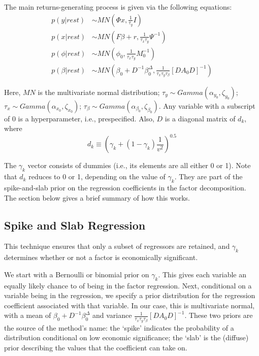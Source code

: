 \documentclass[11pt]{article}
\begin{document}
The main returns-generating process is given via the following equations:
\begin{align}
	p(y | rest) &\sim MN\left( \Phi x, \frac{1}{\tau_y} I \right)	\\
	p(x | rest) &\sim MN\left( F \beta + r, \frac{1}{\tau_x \tau_y} \Psi^{-1} \right)	\\
	\label{eq:phi} p(\phi | rest) &\sim MN\left( \phi_0, \frac{1}{\tau_x \tau_y} M_0^{-1} \right) 	\\
	p(\beta | rest) &\sim MN\left( \beta_0 + D^{-1}\beta_0^\Delta, \frac{1}{\tau_x \tau_y \tau_\beta} [D A_0 D]^{-1} \right)
\end{align}

Here, $MN$ is the multivariate normal distribution; $\tau_y \sim Gamma \left( \alpha_{y_0}, \zeta_{y_0} \right)$; $\tau_x \sim Gamma \left( \alpha_{x_0}, \zeta_{x_0} \right)$; $\tau_\beta \sim Gamma \left( \alpha_{\beta_0}, \zeta_{\beta_0} \right)$. Any variable with a subscript of 0 is a hyperparameter, i.e., prespecified. Also, $D$ is a diagonal matrix of $d_k$, where
\begin{equation}
	d_k \equiv \left( \gamma_k + (1 - \gamma_k) \frac{1}{v^2} \right)^{0.5}
\end{equation}

The $\gamma_k$ vector consists of dummies (i.e., its elements are all either 0 or 1). Note that $d_k$ reduces to 0 or 1, depending on the value of $\gamma_k$.  They are part of the spike-and-slab prior on the regression coefficients in the factor decomposition. The section below gives a brief summary of how this works.

\subsection{Spike and Slab Regression}

This technique ensures that only a subset of regressors are retained, and $\gamma_k$ determines whether or not a factor is economically significant. 

We start with a Bernoulli or binomial prior on $\gamma_k$. This gives each variable an equally likely chance to of being in the factor regression. Next, conditional on a variable being in the regression, we specify a prior distribution for the regression coefficient associated with that variable. In our case, this is multivariate normal, with a mean of $\beta_0 + D^{-1}\beta_0^\Delta$ and variance $\frac{1}{\tau_x \tau_y \tau_\beta} [D A_0 D]^{-1}$. These two priors are the source of the method's name: the `spike' indicates the probability of a distribution conditional on low economic significance; the `slab' is the (diffuse) prior describing the values that the coefficient can take on.
\end{document}
